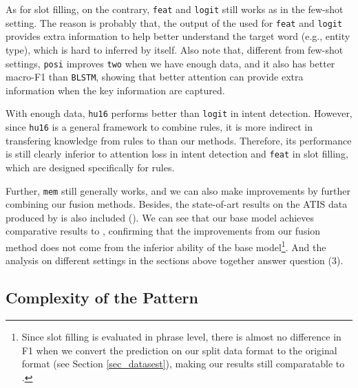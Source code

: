 As for slot filling, on the contrary, \texttt{feat} and \texttt{logit} still works as in the few-shot setting. 
The reason is probably that, 
the output of the \RE used for \texttt{feat} and \texttt{logit} provides extra information to help \NN better understand the target word (e.g., entity type), which is hard to inferred by \NN itself.
Also note that, different from few-shot settings, \texttt{posi} improves \texttt{two} when we have enough data, and it also has better macro-F1 than \texttt{BLSTM}, showing that better attention can provide extra information when the key information are captured. 

With enough data, \texttt{hu16} performs better than \texttt{logit} in intent detection. 
However, since \texttt{hu16} is a general framework to combine \FOL rules, it is more indirect in transfering knowledge from rules to \NN than our methods. Therefore, its performance is still clearly inferior to attention loss in intent detection and \texttt{feat} in slot filling, which are designed specifically for \RE rules.

Further, \texttt{mem} still generally works, and we can also make improvements by further combining our fusion methods. Besides, the state-of-art results on the ATIS data produced by \cite{liu2016attention} is also included (\LL). We can see that our base \BLSTM model achieves comparative results to \LL, confirming that the improvements from our fusion method does not come from the inferior ability of the base model\footnote{Since slot filling is evaluated in phrase level, there is almost no difference in F1 when we convert the prediction on our split data format to the original format (see Section \ref{sec_datasest}), making our results still comparatable to \LL.}. And the analysis on different settings in the sections above together answer question (3).

\subsection{Complexity of the Pattern}


